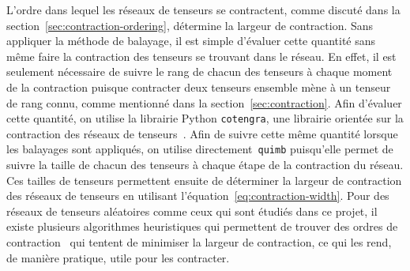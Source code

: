 L'ordre dans lequel les réseaux de tenseurs se contractent, comme discuté dans la section~\ref{sec:contraction-ordering}, détermine la largeur de contraction.
Sans appliquer la méthode de balayage, il est simple d'évaluer cette quantité sans même faire la contraction des tenseurs se trouvant dans le réseau.
En effet, il est seulement nécessaire de suivre le rang de chacun des tenseurs à chaque moment de la contraction puisque contracter deux tenseurs ensemble mène à un tenseur de rang connu, comme mentionné dans la section~\ref{sec:contraction}.
Afin d'évaluer cette quantité, on utilise la librairie Python \verb|cotengra|, une librairie orientée sur la contraction des réseaux de tenseurs~\cite{gray_hyper-optimized_2021}.
Afin de suivre cette même quantité lorsque les balayages sont appliqués, on utilise directement~\verb|quimb| puisqu'elle permet de suivre la taille de chacun des tenseurs à chaque étape de la contraction du réseau.
Ces tailles de tenseurs permettent ensuite de déterminer la largeur de contraction des réseaux de tenseurs en utilisant l'équation~\ref{eq:contraction-width}.
Pour des réseaux de tenseurs aléatoires comme ceux qui sont étudiés dans ce projet, il existe plusieurs algorithmes heuristiques qui permettent de trouver des ordres de contraction~\cite{gray_hyper-optimized_2021, gray_hyper-optimized_2022} qui tentent de minimiser la largeur de contraction, ce qui les rend, de manière pratique, utile pour les contracter.

